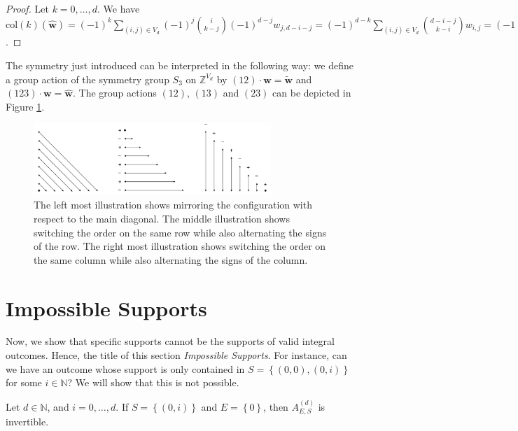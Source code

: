 \begin{proof}
    Let \( k = 0, \dots, d \). We have \( \mathrm{col}(k)(\hat{\mathbf w}) = (-1)^k \sum_{(i,j) \in V_d}(-1)^j \binom{i}{k-j}(-1)^{d-j}w_{j, d-i-j} 
    = (-1)^{d-k} \sum_{(i,j) \in V_d}\binom{d-i-j}{k-i}w_{i, j} 
    = (-1)^{d-k} \mathrm{diag}(k)(\mathbf w) = 0 \).
\end{proof}

The symmetry just introduced can be interpreted in the following way: we define a group action of the symmetry group \( S_3 \) on \( \mathbb{Z}^{V_d} \) by \( (12) \cdot \mathbf w = \tilde{\mathbf w}  \) and \( (123) \cdot \mathbf w = \hat{\mathbf w} \).
The group actions \( (12) \), \( (13) \) and \( (23) \) can be depicted in Figure \ref{fig:group-action-s3}.

\begin{figure}[H]
    \centering
    \includegraphics[width=0.8\textwidth]{assets/group-action-s3.png}
    \caption{The left most illustration shows mirroring the configuration with respect to the main diagonal. The middle illustration shows switching the order on the same row while also alternating the signs of the row. The right most illustration shows switching the order on the same column while also alternating the signs of the column.}
    \label{fig:group-action-s3}
\end{figure}

\section{Impossible Supports}\label{sec:impossible-supports}

Now, we show that specific supports cannot be the supports of valid integral outcomes. Hence, the title of this section \emph{Impossible Supports}. For instance, can we have an outcome whose support is only contained in \( S = \left\{ (0,0), (0,i) \right\} \) for some \( i \in \mathbb{N} \)? We will show that this is not possible.



\begin{proposition}\label{prop:impossible-support-23233243243423}
    Let \( d \in \mathbb{N} \), and \( i=0, \dots, d \). If \( S = \left\{ (0,i) \right\} \) and \( E = \left\{ 0 \right\} \), then \( A^{(d)}_{E,S} \) is invertible.
\end{proposition}

